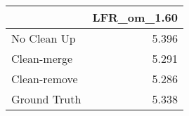\begin{tabular}{lr}
\toprule
{} & LFR_om_1.60 \\
\midrule
No Clean Up  &       5.396 \\
Clean-merge  &       5.291 \\
Clean-remove &       5.286 \\
Ground Truth &       5.338 \\
\bottomrule
\end{tabular}
